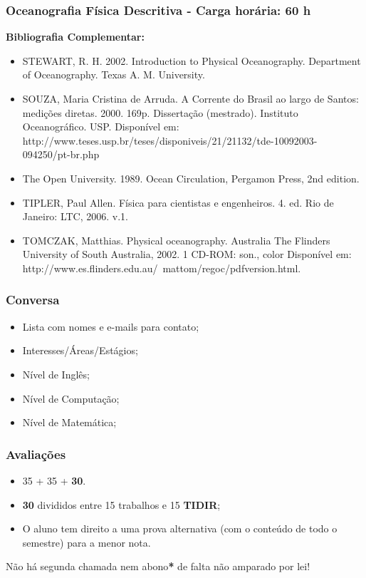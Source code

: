 \documentclass[14pt,xcolor=dvipsnames]{beamer}
\begin{document}
\begin{frame}
    \frametitle{Oceanografia Física Descritiva - Carga horária: 60 h}
    {\scriptsize
    {\bf Bibliografia Complementar:}
    \begin{itemize}[<+-| alert@+>]
        \item STEWART, R. H. 2002. Introduction to Physical Oceanography.
              Department of Oceanography. Texas A. M. University.
        \item SOUZA, Maria Cristina de Arruda. A Corrente do Brasil ao largo de
              Santos: medições diretas. 2000. 169p. Dissertação  (mestrado).
              Instituto Oceanográfico. USP. Disponível  em:
              http://www.teses.usp.br/teses/disponiveis/21/21132/tde-10092003-094250/pt-br.php
        \item The Open University. 1989. Ocean Circulation, Pergamon Press,
              2nd edition.
        \item TIPLER, Paul Allen. Física para cientistas e engenheiros. 4.
              ed. Rio de Janeiro: LTC, 2006. v.1.
        \item TOMCZAK, Matthias. Physical oceanography. Australia The
              Flinders University of South Australia, 2002. 1 CD-ROM:
              son., color Disponível em:
              http://www.es.flinders.edu.au/~mattom/regoc/pdfversion.html.
    \end{itemize}
    }
\end{frame}

\begin{frame}
    \frametitle{Conversa}
    \begin{itemize}
        \item Lista com nomes e e-mails para contato;
        \item Interesses/Áreas/Estágios;
        \item Nível de Inglês;
        \item Nível de Computação;
        \item Nível de Matemática;
    \end{itemize}
\end{frame}

\begin{frame}
    \frametitle{Avaliações}
    \begin{itemize}[<+-| alert@+>]
        \item 35 + 35 + {\bf 30}.
        \item {\bf 30} divididos entre 15 trabalhos e 15 {\bf TIDIR};
        \item O aluno tem direito a uma prova alternativa (com o conteúdo de
              todo o semestre) para a menor nota.
    \end{itemize}
    \pause
    \begin{block}{}
        Não há segunda chamada{\bf *} nem abono{\bf **}
        de falta não amparado por lei!
    \end{block}
    \pause
\end{frame}
\end{document}
